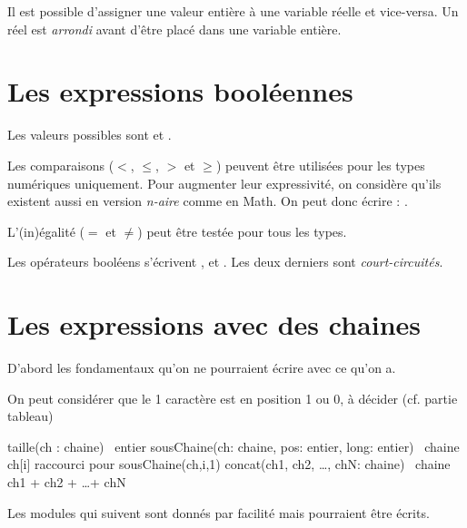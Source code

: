 	Il est possible d'assigner une valeur entière à une variable réelle
	et vice-versa. Un réel est \emph{arrondi} avant d'être placé
	dans une variable entière.

\section{Les expressions booléennes}

	Les valeurs possibles sont  et .
	
	Les comparaisons ($<$, $\leq$, $>$ et $\geq$) peuvent être utilisées
	pour les types numériques uniquement.
	Pour augmenter leur expressivité, on considère qu'ils
	existent aussi en version \emph{n-aire} comme en Math.
	On peut donc écrire : .
	
	L'(in)égalité ($=$ et $\neq$) peut être testée pour tous les types.
	
	Les opérateurs booléens s'écrivent 
	,  et .
	Les deux derniers sont \emph{court-circuités}.

\section{Les expressions avec des chaines}

	D'abord les fondamentaux qu'on ne pourraient écrire avec ce qu'on a.
	
	\begin{Note}
		On peut considérer que le 1\ier{} caractère est en position 1 ou 0,
		à décider (cf. partie tableau)
	\end{Note} 

	\begin{Pseudocode}
		\Stmt taille(ch : chaine) \Gives~entier			
		\Stmt sousChaine(ch: chaine, pos: entier, long: entier) \Gives~chaine 
		\Stmt ch[i]											\RComment raccourci pour sousChaine(ch,i,1)
		\Stmt concat(ch1, ch2, \dots, chN: chaine) \Gives~chaine 	
		\Let  ch1 + ch2 + \dots + chN						
	\end{Pseudocode}
	
	Les modules qui suivent sont donnés par facilité
	mais pourraient être écrits.

